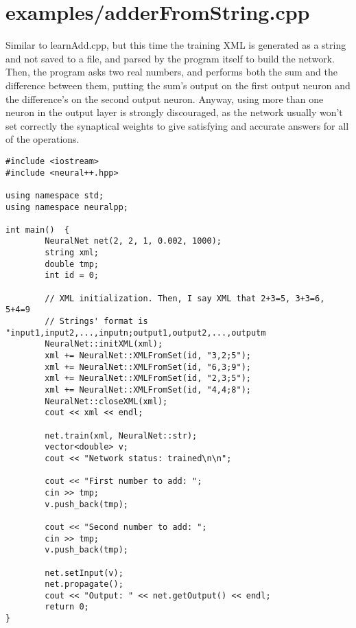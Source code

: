 \section{examples/adderFromString.cpp}
Similar to learnAdd.cpp, but this time the training XML is generated as a string and not saved to a file, and parsed by the program itself to build the network. Then, the program asks two real numbers, and performs both the sum and the difference between them, putting the sum's output on the first output neuron and the difference's on the second output neuron. Anyway, using more than one neuron in the output layer is strongly discouraged, as the network usually won't set correctly the synaptical weights to give satisfying and accurate answers for all of the operations.



\begin{DocInclude}\begin{verbatim}
#include <iostream>
#include <neural++.hpp>

using namespace std;
using namespace neuralpp;

int main()  {
        NeuralNet net(2, 2, 1, 0.002, 1000);
        string xml;
        double tmp;
        int id = 0;

        // XML initialization. Then, I say XML that 2+3=5, 3+3=6, 5+4=9
        // Strings' format is "input1,input2,...,inputn;output1,output2,...,outputm
        NeuralNet::initXML(xml);
        xml += NeuralNet::XMLFromSet(id, "3,2;5");
        xml += NeuralNet::XMLFromSet(id, "6,3;9");
        xml += NeuralNet::XMLFromSet(id, "2,3;5");
        xml += NeuralNet::XMLFromSet(id, "4,4;8");
        NeuralNet::closeXML(xml);
        cout << xml << endl;
        
        net.train(xml, NeuralNet::str);
        vector<double> v;
        cout << "Network status: trained\n\n";

        cout << "First number to add: ";
        cin >> tmp;
        v.push_back(tmp);

        cout << "Second number to add: ";
        cin >> tmp;
        v.push_back(tmp);

        net.setInput(v);
        net.propagate();
        cout << "Output: " << net.getOutput() << endl;
        return 0;
}

\end{verbatim}
\end{DocInclude}
 